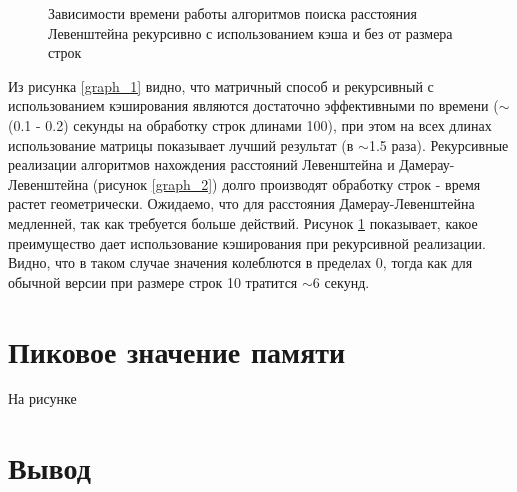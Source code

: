 \begin{figure}[h]
	\caption{Зависимости времени работы алгоритмов поиска расстояния Левенштейна рекурсивно с использованием кэша и без от размера строк}
	\label{graph_3}
\end{figure}
\newpage
Из рисунка \ref{graph_1} видно, что матричный способ и рекурсивный с использованием кэширования являются достаточно эффективными по времени ($\sim$(0.1 - 0.2) секунды на обработку строк длинами 100), при этом на всех длинах использование матрицы показывает лучший результат (в $\sim$1.5 раза). Рекурсивные реализации алгоритмов нахождения расстояний Левенштейна и Дамерау-Левенштейна (рисунок \ref{graph_2}) долго производят обработку строк - время растет геометрически. Ожидаемо, что для расстояния Дамерау-Левенштейна медленней, так как требуется больше действий. Рисунок \ref{graph_3} показывает, какое преимущество дает использование кэширования при рекурсивной реализации. Видно, что в таком случае значения колеблются в пределах 0, тогда как для обычной версии при размере строк 10 тратится $\sim$6 секунд.

\section{Пиковое значение памяти}
На рисунке 

\section{Вывод}